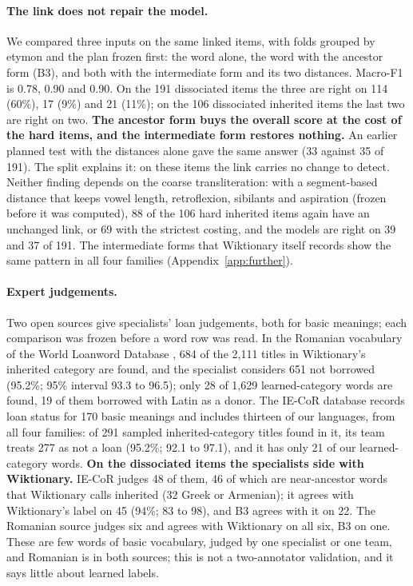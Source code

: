 \documentclass[11pt]{article}
\begin{document}
\paragraph{The link does not repair the model.} We compared three inputs on the same linked items, with folds grouped by etymon and the plan frozen first: the word alone, the word with the ancestor form (B3), and both with the intermediate form and its two distances. Macro-F1 is 0.78, 0.90 and 0.90. On the 191 dissociated items the three are right on 114 (60\%), 17 (9\%) and 21 (11\%); on the 106 dissociated inherited items the last two are right on two. \textbf{The ancestor form buys the overall score at the cost of the hard items, and the intermediate form restores nothing.} An earlier planned test with the distances alone gave the same answer (33 against 35 of 191). The split explains it: on these items the link carries no change to detect. Neither finding depends on the coarse transliteration: with a segment-based distance that keeps vowel length, retroflexion, sibilants and aspiration (frozen before it was computed), 88 of the 106 hard inherited items again have an unchanged link, or 69 with the strictest costing, and the models are right on 39 and 37 of 191. The intermediate forms that Wiktionary itself records show the same pattern in all four families (Appendix~\ref{app:further}).

\paragraph{Expert judgements.} Two open sources give specialists' loan judgements, both for basic meanings; each comparison was frozen before a word row was read. In the Romanian vocabulary of the World Loanword Database \citep{schulte2009romanian}, 684 of the 2,111 titles in Wiktionary's inherited category are found, and the specialist considers 651 not borrowed (95.2\%; 95\% interval 93.3 to 96.5); only 28 of 1,629 learned-category words are found, 19 of them borrowed with Latin as a donor. The IE-CoR database \citep{heggarty2024iecor} records loan status for 170 basic meanings and includes thirteen of our languages, from all four families: of 291 sampled inherited-category titles found in it, its team treats 277 as not a loan (95.2\%; 92.1 to 97.1), and it has only 21 of our learned-category words. \textbf{On the dissociated items the specialists side with Wiktionary.} IE-CoR judges 48 of them, 46 of which are near-ancestor words that Wiktionary calls inherited (32 Greek or Armenian); it agrees with Wiktionary's label on 45 (94\%; 83 to 98), and B3 agrees with it on 22. The Romanian source judges six and agrees with Wiktionary on all six, B3 on one. These are few words of basic vocabulary, judged by one specialist or one team, and Romanian is in both sources; this is not a two-annotator validation, and it says little about learned labels.
\end{document}
